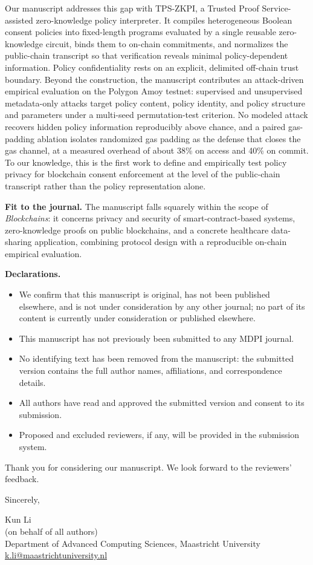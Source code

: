 \documentclass[11pt]{article}
\begin{document}
Our manuscript addresses this gap with TPS-ZKPI, a Trusted Proof
Service-assisted zero-knowledge policy interpreter. It compiles heterogeneous
Boolean consent policies into fixed-length programs evaluated by a single
reusable zero-knowledge circuit, binds them to on-chain commitments, and
normalizes the public-chain transcript so that verification reveals minimal
policy-dependent information. Policy confidentiality rests on an explicit,
delimited off-chain trust boundary. Beyond the construction, the manuscript contributes an
attack-driven empirical evaluation on the Polygon Amoy testnet: supervised and
unsupervised metadata-only attacks target policy content, policy identity, and
policy structure and parameters under a multi-seed permutation-test criterion.
No modeled attack recovers hidden policy information reproducibly above
chance, and a paired gas-padding ablation isolates randomized gas padding as
the defense that closes the gas channel, at a measured overhead of about
38\% on access and 40\% on commit. To our knowledge, this is the first work to
define and empirically test policy privacy for blockchain consent enforcement
at the level of the public-chain transcript rather than the policy
representation alone.

\textbf{Fit to the journal.}
The manuscript falls squarely within the scope of \emph{Blockchains}: it
concerns privacy and security of smart-contract-based systems, zero-knowledge
proofs on public blockchains, and a concrete healthcare data-sharing
application, combining protocol design with a reproducible on-chain empirical
evaluation.

\textbf{Declarations.}
\begin{itemize}
	\setlength\itemsep{0.1em}
	\item We confirm that this manuscript is original, has not been published
	      elsewhere, and is not under consideration by any other journal; no part of
	      its content is currently under consideration or published elsewhere.
	\item This manuscript has not previously been submitted to any MDPI journal.
	\item No identifying text has been removed from the manuscript: the submitted
	      version contains the full author names, affiliations, and correspondence
	      details.
	\item All authors have read and approved the submitted version and consent to
	      its submission.
	\item Proposed and excluded reviewers, if any, will be provided in the
	      submission system.
\end{itemize}

Thank you for considering our manuscript. We look forward to the reviewers'
feedback.

Sincerely,

Kun Li\\
(on behalf of all authors)\\
Department of Advanced Computing Sciences, Maastricht University\\
\href{mailto:k.li@maastrichtuniversity.nl}{k.li@maastrichtuniversity.nl}
\end{document}
